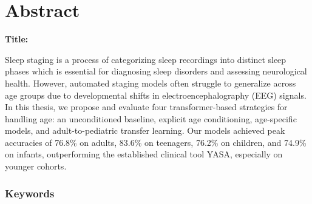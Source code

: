 \chapter*{Abstract}

\noindent\textbf{Title:} \ttitleEn
\bigskip

Sleep staging is a process of categorizing sleep recordings into distinct
sleep phases which is essential for diagnosing sleep disorders and assessing
neurological health. However, automated staging models often struggle to generalize
across age groups due to developmental shifts in electroencephalography (EEG) signals. In this thesis, we propose
and evaluate four transformer-based strategies for handling age: an unconditioned baseline,
explicit age conditioning, age-specific models, and adult-to-pediatric transfer learning.
Our models achieved peak accuracies of 76.8\% on adults, 83.6\% on teenagers, 76.2\% on children,
and 74.9\% on infants, outperforming the established clinical tool YASA, especially on younger cohorts.

\subsection*{Keywords}
\textit{\tkeywordsEn}
\clearemptydoublepage